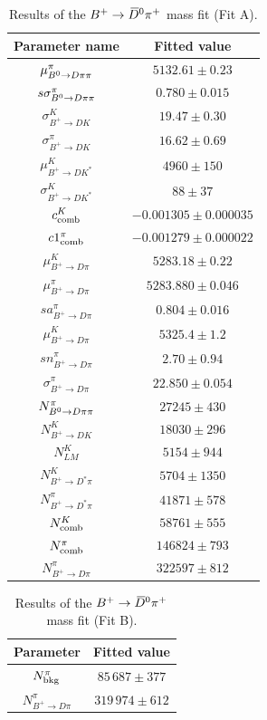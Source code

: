 \begin{table}[htbp]
  \begin{center}
    \caption{Results of the $B^+\rightarrow\kern 0.2em\overline{\kern -0.2em D}{}^0\pi^+$ mass fit (Fit A).}
    \begin{tabular}{cc}
\toprule
   Parameter name & Fitted value \\
\midrule
$\mu^{\pi}_{B^0\rightarrow D\pi\pi}$ & $5132.61\pm0.23$ \\
$s\sigma^{\pi}_{B^0\rightarrow D\pi\pi}$ & $0.780\pm0.015$ \\
$\sigma^{K}_{B^{+}\to DK}$ & $19.47\pm0.30$ \\
$\sigma^{\pi}_{B^{+}\to DK}$ & $16.62\pm0.69$ \\
$\mu^{K}_{B^{+}\to DK^{*}}$ & $4960\pm150$ \\
$\sigma^{K}_{B^{+}\to DK^{*}}$ & $88\pm37$ \\
$c^{K}_{\rm comb}$ & $-0.001305\pm0.000035$ \\
$c1^{\pi}_{\rm comb}$ & $-0.001279\pm0.000022$ \\
$\mu^{K}_{B^{+}\to D\pi}$ & $5283.18\pm0.22$ \\
$\mu^{\pi}_{B^{+}\to D\pi}$ & $5283.880\pm0.046$ \\
$sa^{\pi}_{B^{+}\to D\pi}$ & $0.804\pm0.016$ \\
$\mu^{K}_{B^{+}\to D\pi}$ & $5325.4\pm1.2$ \\
$sn^{\pi}_{B^{+}\to D\pi}$ & $2.70\pm0.94$ \\
$\sigma^{\pi}_{B^{+}\to D\pi}$ & $22.850\pm0.054$ \\
$N^{\pi}_{B^0\rightarrow D\pi\pi}$ & $27245\pm430$ \\
$N^{K}_{B^{+}\to DK}$ & $18030\pm296$ \\
$N^{K}_{LM}$ & $5154\pm944$ \\
$N^{K}_{B^{+}\to D^{*}\pi}$ & $5704\pm1350$ \\
$N^{\pi}_{B^{+}\to D^{*}\pi}$ & $41871\pm578$ \\
$N^{K}_{\rm comb}$ & $58761\pm555$ \\
$N^{\pi}_{\rm comb}$ & $146824\pm793$ \\
$N^{\pi}_{B^{+}\to D\pi}$ & $322597\pm812$ \\
\bottomrule
    \end{tabular}
    \label{tab:OSmassFitA}
  \end{center}
\end{table}

\begin{table}[htbp]
  \begin{center}
    \caption{Results of the $B^+\rightarrow\kern 0.2em\overline{\kern -0.2em D}{}^0\pi^+$ mass fit (Fit B).}
    \begin{tabular}{cc}
      \toprule
    Parameter & Fitted value \\
    \midrule
    $N^{\pi}_{\rm bkg}$ & $85\,687\pm377$ \\
    $N^{\pi}_{B^{+}\to D\pi}$ & $319\,974\pm612$ \\
    \bottomrule
    \end{tabular}
    \label{tab:OSmassFitB}
  \end{center}
\end{table}

